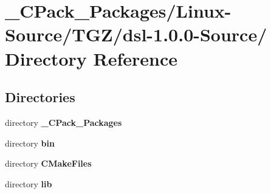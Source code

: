 \section{\_\-CPack\_\-Packages/Linux-\/Source/TGZ/dsl-\/1.0.0-\/Source/ Directory Reference}
\label{dir_9d4e1b2b4d1522c5ac82a7a0d0484f4d}
\subsection*{Directories}
\begin{DoxyCompactItemize}
\item 
directory {\bf \_\-CPack\_\-Packages}
\item 
directory {\bf bin}
\item 
directory {\bf CMakeFiles}
\item 
directory {\bf lib}
\end{DoxyCompactItemize}
